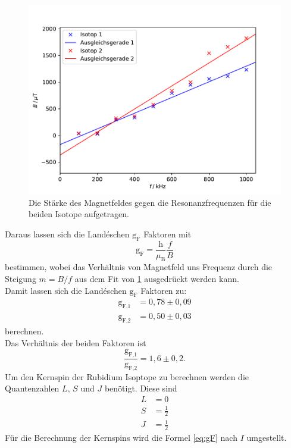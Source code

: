 \begin{figure}
  \centering
  \includegraphics{plots/BFelder.pdf}
  \caption{Die Stärke des Magnetfeldes gegen die Resonanzfrequenzen für die beiden Isotope
  aufgetragen.}
  \label{fig:BFelder}
\end{figure}
Daraus lassen sich die Landéschen $\text{g}_{\text{F}}$ Faktoren mit
\begin{equation}
  \text{g}_{\text{F}}=\frac{\text{h}}{\mu_{\text{B}}} \frac{f}{B}
\end{equation}
bestimmen, wobei das Verhältnis von Magnetfeld uns Frequenz durch die
Steigung $m=B/f$ aus dem Fit von \ref{fig:BFelder} ausgedrückt werden kann.\\
Damit lassen sich die Landéschen $\text{g}_{\text{F}}$ Faktoren zu:
\begin{align*}
  \text{g}_{\text{F,1}}&=0,78 \pm 0,09 \\
  \text{g}_{\text{F,2}}&= 0,50 \pm 0,03
\end{align*}
berechnen.\\
Das Verhältnis der beiden Faktoren ist
\begin{equation}
  \frac{\text{g}_{\text{F,1}}}{  \text{g}_{\text{F,2}}}= 1,6 \pm 0,2.
\end{equation}
Um den Kernspin der Rubidium Isoptope zu berechnen werden die Quantenzahlen $L$,
$S$ und $J$ benötigt.
Diese sind
\begin{align*}
  L&=0\\
  S&=\frac{1}{2}\\
  J&=\frac{1}{2}
\end{align*}
Für die Berechnung der Kernspins wird die Formel \ref{eq:gF} nach $I$ umgestellt.
